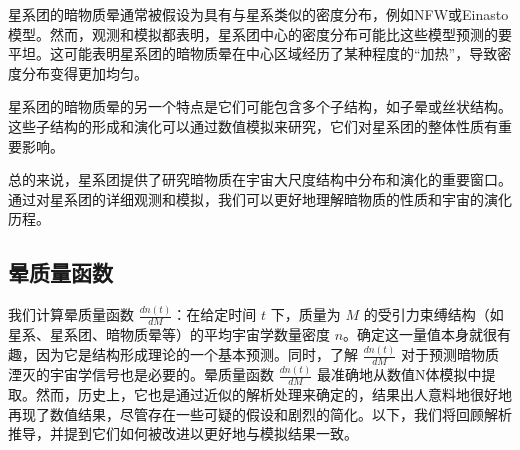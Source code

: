 星系团的暗物质晕通常被假设为具有与星系类似的密度分布，例如NFW或Einasto模型。然而，观测和模拟都表明，星系团中心的密度分布可能比这些模型预测的要平坦。这可能表明星系团的暗物质晕在中心区域经历了某种程度的“加热”，导致密度分布变得更加均匀。

星系团的暗物质晕的另一个特点是它们可能包含多个子结构，如子晕或丝状结构。这些子结构的形成和演化可以通过数值模拟来研究，它们对星系团的整体性质有重要影响。

总的来说，星系团提供了研究暗物质在宇宙大尺度结构中分布和演化的重要窗口。通过对星系团的详细观测和模拟，我们可以更好地理解暗物质的性质和宇宙的演化历程。 

\subsection{晕质量函数} 

我们计算晕质量函数 \( \frac{dn(t)}{dM} \)：在给定时间 \( t \) 下，质量为 \( M \) 的受引力束缚结构（如星系、星系团、暗物质晕等）的平均宇宙学数量密度 \( n \)。确定这一量值本身就很有趣，因为它是结构形成理论的一个基本预测。同时，了解 \( \frac{dn(t)}{dM} \) 对于预测暗物质湮灭的宇宙学信号也是必要的。晕质量函数 \( \frac{dn(t)}{dM} \) 最准确地从数值N体模拟中提取。然而，历史上，它也是通过近似的解析处理来确定的，结果出人意料地很好地再现了数值结果，尽管存在一些可疑的假设和剧烈的简化。以下，我们将回顾解析推导，并提到它们如何被改进以更好地与模拟结果一致。

